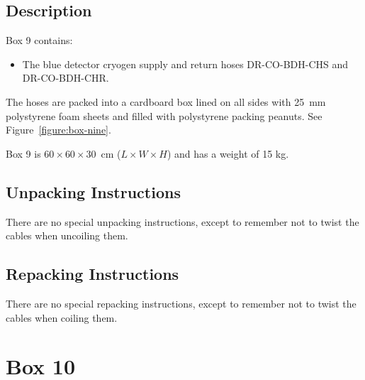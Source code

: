 \documentclass{article}
\begin{document}
\subsection{Description}

Box 9 contains:

\begin{itemize}
    \item The blue detector cryogen supply and return hoses DR-CO-BDH-CHS and DR-CO-BDH-CHR.
\end{itemize}

The hoses are packed into a cardboard box lined on all sides with 25~mm polystyrene foam sheets and filled with polystyrene packing peanuts. See Figure~\ref{figure:box-nine}.

Box 9 is  $60 \times 60 \times 30$~cm ($L \times W \times H$) and has a weight of 15 kg.

\subsection{Unpacking Instructions}

There are no special unpacking instructions, except to remember not to twist the cables when uncoiling them.

\subsection{Repacking Instructions}

There are no special repacking instructions, except to remember not to twist the cables when coiling them.


\clearpage
\section{Box 10}
\end{document}
